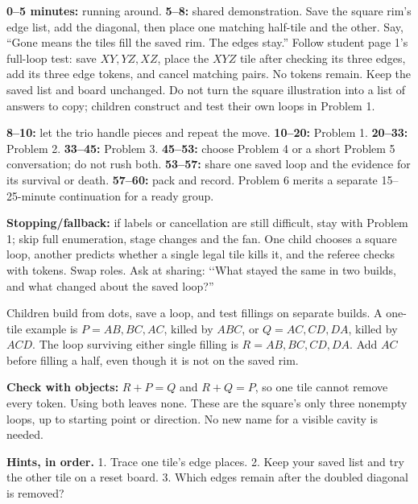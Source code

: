 \documentclass[10pt,letterpaper]{article}
\newcommand{\sectiontitle}[1]{\par\vspace{5pt}{\bfseries\fontsize{12}{14}\selectfont #1}\par}
\newcommand{\hint}[1]{\par\textbf{Hints, in order.} #1}
\begin{document}
\textbf{0--5 minutes:} running around. \textbf{5--8:} shared demonstration. Save the square rim's edge list, add the diagonal, then place one matching half-tile and the other. Say, ``Gone means the tiles fill the saved rim. The edges stay.'' Follow student page 1's full-loop test: save \(XY,YZ,XZ\), place the \(XYZ\) tile after checking its three edges, add its three edge tokens, and cancel matching pairs. No tokens remain. Keep the saved list and board unchanged. Do not turn the square illustration into a list of answers to copy; children construct and test their own loops in Problem 1.

\textbf{8--10:} let the trio handle pieces and repeat the move. \textbf{10--20:} Problem 1.
\textbf{20--33:} Problem 2. \textbf{33--45:} Problem 3.
\textbf{45--53:} choose Problem 4 or a short Problem 5 conversation; do not rush both.
\textbf{53--57:} share one saved loop and the evidence for its survival or death.
\textbf{57--60:} pack and record. Problem 6 merits a separate 15--25-minute continuation for a ready group.

\textbf{Stopping/fallback:} if labels or cancellation are still difficult, stay with Problem 1; skip full enumeration, stage changes and the fan. One child chooses a square loop, another predicts whether a single legal tile kills it, and the referee checks with tokens. Swap roles. Ask at sharing: \lq\lq What stayed the same in two builds, and what changed about the saved loop?''

\sectiontitle{Problem 1, page 2: one filling or two? \quad Core}
Children build from dots, save a loop, and test fillings on separate builds.
A one-tile example is \(P=AB,BC,AC\), killed by \(ABC\), or \(Q=AC,CD,DA\), killed by \(ACD\).
The loop surviving either single filling is \(R=AB,BC,CD,DA\).
Add \(AC\) before filling a half, even though it is not on the saved rim.

\textbf{Check with objects:} \(R+P=Q\) and \(R+Q=P\), so one tile cannot remove every token. Using both leaves none. These are the square's only three nonempty loops, up to starting point or direction. No new name for a visible cavity is needed.
\hint{1. Trace one tile's edge places. 2. Keep your saved list and try the other tile on a reset board. 3. Which edges remain after the doubled diagonal is removed?}
\end{document}
